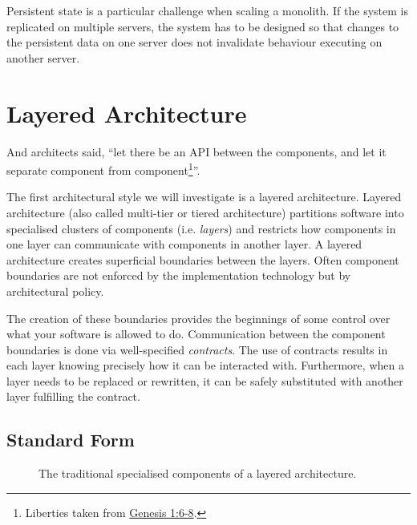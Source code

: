 Persistent state is a particular challenge when scaling a monolith.
If the system is replicated on multiple servers,
the system has to be designed so that changes to the persistent data on one server
does not invalidate behaviour executing on another server.


\section{Layered Architecture}

And architects said, ``let there be an API between the components,
and let it separate component from component\footnote{Liberties taken from
\href{https://www.biblegateway.com/passage/?search=gen+1\&version=ESV}{Genesis 1:6-8}.}''.

The first architectural style we will investigate is a layered architecture.
Layered architecture (also called multi-tier or tiered architecture) 
partitions software into specialised clusters of components (i.e. \emph{layers})
and restricts how components in one layer can communicate with components in another layer.
A layered architecture creates superficial boundaries between the layers.
Often component boundaries are not enforced by the implementation technology but by architectural policy.

The creation of these boundaries provides the beginnings of some control over what your software is allowed to do.
Communication between the component boundaries is done via well-specified \emph{contracts}.
The use of contracts results in each layer knowing precisely how it can be interacted with.
Furthermore, when a layer needs to be replaced or rewritten, it can be safely substituted with another layer fulfilling the contract.


\subsection{Standard Form}

\begin{figure}[ht]
\centering
{}
\caption{The traditional specialised components of a layered architecture.}
\label{fig:traditional-layered}
\end{figure}

